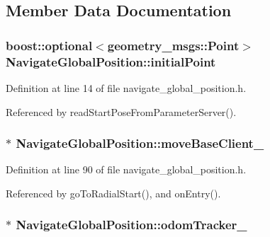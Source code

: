 \subsection{Member Data Documentation}
\subsubsection[{\texorpdfstring{initial\+Point}{initialPoint}}]{\setlength{\rightskip}{0pt plus 5cm}boost\+::optional$<$geometry\+\_\+msgs\+::\+Point$>$ Navigate\+Global\+Position\+::initial\+Point}\hypertarget{classNavigateGlobalPosition_a3b8beafc64a18063c86228b6c497102b}{}\label{classNavigateGlobalPosition_a3b8beafc64a18063c86228b6c497102b}


Definition at line 14 of file navigate\+\_\+global\+\_\+position.\+h.



Referenced by read\+Start\+Pose\+From\+Parameter\+Server().

\subsubsection[{\texorpdfstring{move\+Base\+Client\+\_\+}{moveBaseClient_}}]{$\ast$ Navigate\+Global\+Position\+::move\+Base\+Client\+\_\+\hspace{0.3cm}{\ttfamily [private]}}\hypertarget{classNavigateGlobalPosition_a1fdbaa1d3924509637a53b991d195670}{}\label{classNavigateGlobalPosition_a1fdbaa1d3924509637a53b991d195670}


Definition at line 90 of file navigate\+\_\+global\+\_\+position.\+h.



Referenced by go\+To\+Radial\+Start(), and on\+Entry().

\subsubsection[{\texorpdfstring{odom\+Tracker\+\_\+}{odomTracker_}}]{$\ast$ Navigate\+Global\+Position\+::odom\+Tracker\+\_\+\hspace{0.3cm}{\ttfamily [private]}}\hypertarget{classNavigateGlobalPosition_a7bec01b571fac3c04008b7fab84dfb3d}{}\label{classNavigateGlobalPosition_a7bec01b571fac3c04008b7fab84dfb3d}


